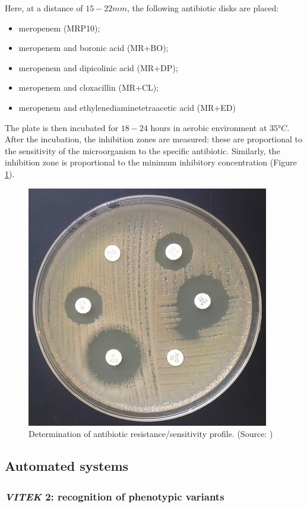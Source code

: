 \documentclass[11pt]{report}
\begin{document}
Here, at a distance of $15-22 mm$, the following antibiotic disks are placed:
\begin{itemize}
\item meropenem (MRP10);
\item meropenem and boronic acid (MR+BO);
\item meropenem and dipicolinic acid (MR+DP);
\item meropenem and cloxacillin (MR+CL);
\item meropenem and ethylenediaminetetraacetic acid (MR+ED)
\end{itemize}

The plate is then incubated for $18-24$ hours in aerobic environment at $35°C$.
After the incubation, the inhibition zones are measured: these are proportional to the sensitivity of the microorganism to the specific antibiotic.
Similarly, the inhibition zone is proportional to the minimum inhibitory concentration (Figure \ref{carlos3}).

\begin{figure}[htp]
\centering
\includegraphics[scale=0.93]{img/carlos3.jpg}
\caption{Determination of antibiotic resistance/sensitivity profile. (Source: \cite{carlos3})}
\label{carlos3}
\end{figure}

\clearpage
\subsection{Automated systems}
\subsubsection{\emph{VITEK}\textsuperscript{\textregistered} 2: recognition of phenotypic variants}
\end{document}
